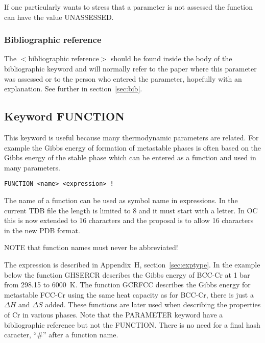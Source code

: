 \documentclass[12pt]{article}
\begin{document}
If one particularly wants to stress that a parameter is not assessed
the function can have the value UNASSESSED.

\subsubsection{Bibliographic reference}

The $<$bibliographic reference$>$ should be found inside the body of
the bibliographic keyword and will normally refer to the paper where
this parameter was assessed or to the person who entered the
parameter, hopefully with an explanation.  See further in
section~\ref{sec:bib}.


\subsection{Keyword FUNCTION}

This keyword is
useful because many thermodynamic parameters are related.  For example
the Gibbs energy of formation of metastable phases is often based on
the Gibbs energy of the stable phase which can be entered
as a function and used in many parameters.

\begin{verbatim}
FUNCTION <name> <expression> !
\end{verbatim}

The name of a function can be used as symbol name in expressions.  In
the current TDB file the length is limited to 8 and it must start with
a letter.  In OC this is now extended to 16 characters and the
proposal is to allow 16 characters in the new PDB format.

NOTE that function names must never be abbreviated!

The expression is described in Appendix~H, section~\ref{sec:exptype}.
In the example below the function GHSERCR describes the Gibbs energy
of BCC-Cr at 1 bar from 298.15 to 6000~K.  The function GCRFCC
describes the Gibbs energy for metastable FCC-Cr using the same heat
capacity as for BCC-Cr, there is just a $\Delta H$ and $\Delta S$
added.  These functions are later used when describing the properties
of Cr in various phases.  Note that the PARAMETER keyword have a
bibliographic reference but not the FUNCTION.  There is no need for a
final hash caracter, ``\#'' after a function name.
\end{document}
